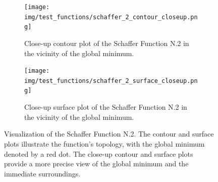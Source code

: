 \begin{figure}[ht!]
{    }
    \begin{subfigure}[b]{0.45\textwidth}
      \centering
      \texttt{[image: img/test\_functions/schaffer\_2\_contour\_closeup.png]}
      \caption{
        Close-up contour plot of the Schaffer Function N.2 in the vicinity of
        the global minimum.
      }
    \end{subfigure}
    \hfill
    \begin{subfigure}[b]{0.45\textwidth}
      \centering
      \texttt{[image: img/test\_functions/schaffer\_2\_surface\_closeup.png]}
      \caption{
        Close-up surface plot of the Schaffer Function N.2 in the vicinity of
        the global minimum.
      }
    \end{subfigure}
    \caption{
      Visualization of the Schaffer Function N.2.
      The contour and surface plots illustrate the function's topology, with the
      global minimum denoted by a red dot.
      The close-up contour and surface plots provide a more precise view of the 
      global minimum and the immediate surroundings.
    }
    \label{fig:app:test:schaffer_2}
  \end{figure}